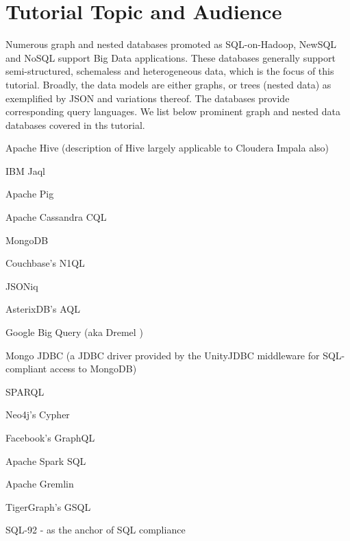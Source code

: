 
\section{Tutorial Topic and Audience}
Numerous graph and nested databases promoted as SQL-on-Hadoop, NewSQL and NoSQL support Big Data applications. These databases generally support semi-structured, schemaless and heterogeneous data, which is the focus of this tutorial. Broadly, the data models are either graphs, or trees (nested data) as exemplified by JSON and variations thereof. The databases provide corresponding query languages. We list below prominent graph and nested data databases covered in ths tutorial.


\begin{compact_enum}
\item Apache Hive \cite{hive-icde-2010} (description of Hive largely applicable to Cloudera Impala \cite{impala} also)
\item IBM Jaql \cite{jaql-pvldb-2011}
\item Apache Pig \cite{pig-sigmod-2008}
\item Apache Cassandra CQL \cite{cassandra-osr-2010}
\item MongoDB \cite{mongodb}
\item Couchbase's N1QL \cite{couchbase,couchbase-sigmod-2016}
\item JSONiq \cite{jsoniq-ieee-ic-2013}
\item AsterixDB's AQL \cite{asterixdb-dpd-2011-all-authors}
\item Google Big Query (aka Dremel \cite{dremel-pvldb-2010})
\item Mongo JDBC \cite{unityjdbc} (a JDBC driver provided by the UnityJDBC middleware for SQL-compliant access to MongoDB)
\item SPARQL \cite{sparql}
\item Neo4j's Cypher \cite{cypher}
\item Facebook's GraphQL \cite{graphql}
\item Apache Spark SQL \cite{sparksql}
\item Apache Gremlin \cite{gremlin}
\item TigerGraph's GSQL \cite{gsql}
\item SQL-92 - as the anchor of SQL compliance
\end{compact_enum}


